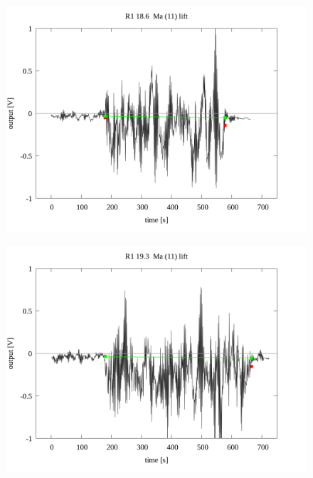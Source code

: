 \documentclass[a4paper]{jsarticle}
\begin{document}
\begin{figure}[htbp]
    \footnotesize
    \begin{center}
        \includegraphics[width=140mm]{../../../../33_result/210806/moving_average/11/lift/03/R1_18.6_ma(11)_lift_03.png}
    \end{center}
\end{figure}

\begin{figure}[htbp]
    \footnotesize
    \begin{center}
        \includegraphics[width=140mm]{../../../../33_result/210806/moving_average/11/lift/03/R1_19.3_ma(11)_lift_03.png}
    \end{center}
\end{figure}
\end{document}
